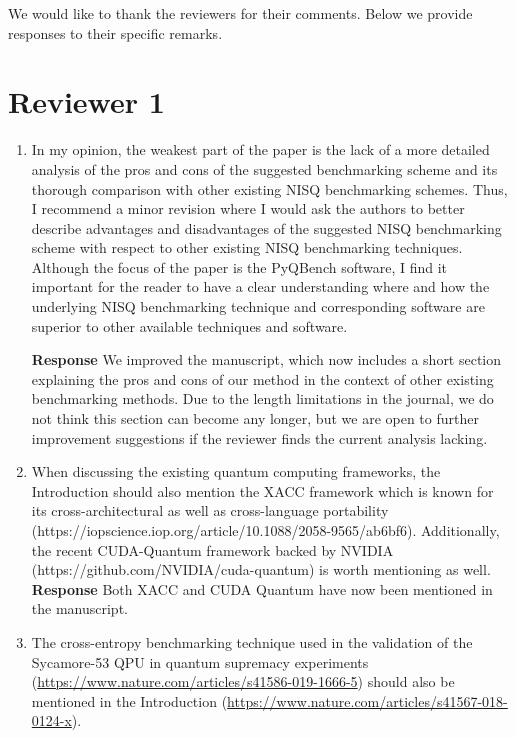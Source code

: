 \documentclass[a4paper,12pt]{article}
\newcommand{\1}{{\rm 1\hspace{-0.9mm}l}}
\newenvironment{response}{\vspace{1em}\noindent\textbf{Response}}{\vspace{1em}}
\begin{document}
We would like to thank the reviewers for their comments. Below we provide
responses to their specific remarks.

\section{Reviewer 1}

\begin{enumerate}
  \item  In my opinion, the weakest part of the paper is the lack of a more
    detailed analysis of the pros and cons of the suggested benchmarking scheme
    and its thorough comparison with other existing NISQ benchmarking schemes.
    Thus, I recommend a minor revision where I would ask the authors to better
    describe advantages and disadvantages of the suggested NISQ benchmarking
    scheme with respect to other existing NISQ benchmarking techniques.
    Although the focus of the paper is the PyQBench software, I find it
    important for the reader to have a clear understanding where and how the
    underlying NISQ benchmarking technique and corresponding software are
    superior to other available techniques and software.

    \begin{response}
      We improved the manuscript, which now includes a short section explaining
      the pros and cons of our method in the context of other existing
      benchmarking methods. Due to the length limitations in the journal, we do
      not think this section can become any longer, but we are open to further
      improvement suggestions if the reviewer finds the current analysis
      lacking.
    \end{response}
  \item When discussing the existing quantum computing frameworks, the
    Introduction should also mention the XACC framework which is known for its
    cross-architectural as well as cross-language portability
    (https://iopscience.iop.org/article/10.1088/2058-9565/ab6bf6).
    Additionally, the recent CUDA-Quantum framework backed by NVIDIA
    (https://github.com/NVIDIA/cuda-quantum) is worth mentioning as well.
    \begin{response}
      Both XACC and CUDA Quantum have now been mentioned in the manuscript.
    \end{response}
  \item The cross-entropy benchmarking technique used in the validation of the
    Sycamore-53 QPU in quantum supremacy experiments
    (\url{https://www.nature.com/articles/s41586-019-1666-5}) should also be
    mentioned in the Introduction
    (\url{https://www.nature.com/articles/s41567-018-0124-x}).


\end{enumerate}
\end{document}
